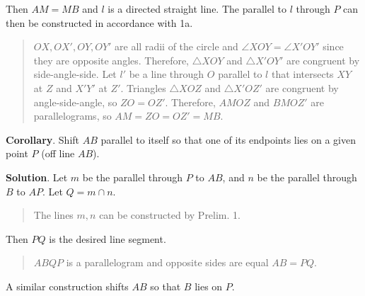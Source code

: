\documentclass[11pt,a4paper]{article}
\newcommand*{\qed}{%
$\quad\quad$\raisebox{2pt}{\framebox[10pt]{\rule{0pt}{4pt}}}%
}
\begin{document}
Then $AM = MB$ and $l$ is a directed straight line. The parallel to $l$ through $P$ can then be constructed in accordance with 1a. \qed
\begin{quote}
\vspace*{-6pt}
$OX,OX',OY,OY'$ are all radii of the circle and $\angle XOY = \angle X'OY'$ since they are opposite angles. Therefore, $\triangle XOY$ and $\triangle X'OY'$ are congruent by side-angle-side. Let $l'$ be a line through $O$ parallel to $l$ that intersects $XY$ at $Z$ and $X'Y'$ at $Z'$. Triangles $\triangle XOZ$ and $\triangle X'OZ'$ are congruent by angle-side-angle, so $ZO=OZ'$. Therefore, $AMOZ$ and $BMOZ'$ are parallelograms, so $AM=ZO=OZ'=MB$.
\vspace*{-6pt}
\end{quote}

\textbf{Corollary}. Shift $AB$ parallel to itself so that one of its endpoints lies on a given point $P$ (off line $AB$).

\textbf{Solution}. Let $m$ be the parallel through $P$ to $AB$, and $n$ be the parallel through $B$ to $AP$. Let $Q = m \cap n$. 
\begin{quote}
\vspace*{-6pt}
The lines $m,n$ can be constructed by Prelim. 1.
\vspace*{-6pt}
\end{quote}
\begin{center}
\end{center}
Then $PQ$ is the desired line segment.
\begin{quote}
\vspace*{-8pt}
$ABQP$ is a parallelogram and opposite sides are equal $AB=PQ$.
\vspace*{-8pt}
\end{quote}
A similar construction shifts $AB$ so that $B$ lies on $P$. \qed 
\end{document}
